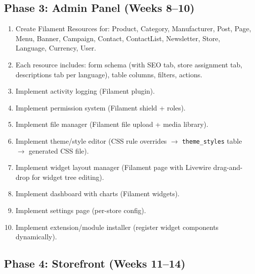 \documentclass[11pt,a4paper]{article}
\begin{document}
\subsection{Phase 3: Admin Panel (Weeks 8--10)}

\begin{enumerate}[leftmargin=1.6em,itemsep=2pt]
  \item Create Filament Resources for: Product, Category,
        Manufacturer, Post, Page, Menu, Banner, Campaign, Contact,
        ContactList, Newsletter, Store, Language, Currency, User.
  \item Each resource includes: form schema (with SEO tab, store
        assignment tab, descriptions tab per language), table columns,
        filters, actions.
  \item Implement activity logging (Filament plugin).
  \item Implement permission system (Filament shield + roles).
  \item Implement file manager (Filament file upload + media library).
  \item Implement theme/style editor (CSS rule overrides $\to$
        \texttt{theme\_styles} table $\to$ generated CSS file).
  \item Implement widget layout manager (Filament page with Livewire
        drag-and-drop for widget tree editing).
  \item Implement dashboard with charts (Filament widgets).
  \item Implement settings page (per-store config).
  \item Implement extension/module installer (register widget
        components dynamically).
\end{enumerate}

\subsection{Phase 4: Storefront (Weeks 11--14)}
\end{document}
